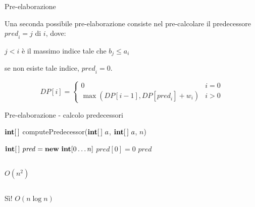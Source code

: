 \begin{frame}{Pre-elaborazione}

\vspace{-6pt}
Una seconda possibile pre-elaborazione consiste nel pre-calcolare il \alert{predecessore} \alert{$\mathit{pred}_i = j$} di $i$, dove:
\BIL
\item $j<i$ è il massimo indice tale che $b_j \leq a_i$
\item se non esiste tale indice, $\mathit{pred}_i=0$.
\EIL

\begin{center}
\end{center}


\[
  DP[i] = \begin{cases}
    0 & i = 0 \\
    \max (DP[i-1], DP[\mathit{pred}_i] + w_i) & i > 0
  \end{cases}
\]

\end{frame}

\begin{frame}{Pre-elaborazione - calcolo predecessori}

\vspace{-6pt}
\begin{Procedure}
\caption[A]{$\INTEGER[\,]$ \textsf{computePredecessor($\INTEGER[\,]\ a$, $\INTEGER[\,]\ a$, \INTEGER $n$)}}    
$\INTARRAY\ \mathit{pred} = \NEW\ \INTEGER[0 \ldots n]$\;
$\mathit{pred}[0] = 0$\;
\Return $\mathit{pred}$\;
\end{Procedure}

\vspace{-6pt}
\begin{columns}[T]
\pause
{}
\bigskip\smallskip
$O(n^2)$
\end{columns}

\begin{columns}[T]
\pause
{}
\bigskip\smallskip
Sì! $O(n \log n)$
\end{columns}

\end{frame}


